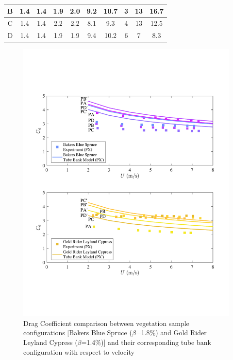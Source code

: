 \documentclass[12pt]{article}
\begin{document}
\begin{table}[!]
\begin{tabular}{|c|c|c|c|c|c|c|c|c|c|}
    B                            & 1.4          & 1.4      & 1.9                  & 2.0               & 9.2               & 10.7        & 3                           & 13            &   16.7                 \\ \hline
    C                            & 1.4           & 1.4     & 2.2                  & 2.2                & 8.1               & 9.3       & 4                          & 13               &   12.5       \\ \hline
    D                            & 1.4            & 1.4      & 1.9                  & 1.9                & 9.4               & 10.2       & 6                          & 7              &   8.3             \\ \hline
    \end{tabular}
\end{table}

\begin{figure}[!]
	\centering
\includegraphics[width=\textwidth,keepaspectratio]{Picture13.pdf}
	\caption[Drag Coefficient comparison between vegetation samples and tube bank configurations]{Drag Coefficient comparison between vegetation sample configurations [Bakers Blue Spruce ($\beta$=1.8\%) and Gold Rider Leyland Cypress ($\beta$=1.4\%)] and their corresponding tube bank configuration with respect to velocity}
	\label{fig:TBGR}
\end{figure}
\end{document}

